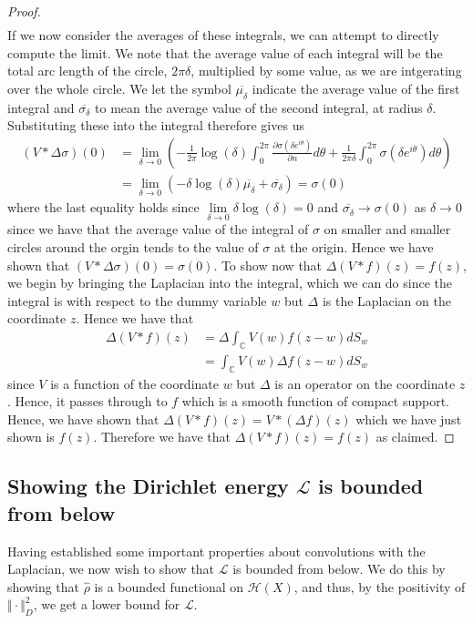 \documentclass[11pt]{report}
\theoremstyle{definition}
\begin{document}
\begin{proof}
\begin{align*}
  \end{align*}
  If we now consider the averages of these integrals, we can attempt to directly compute the limit. We note that the average value of each integral will be the total arc length of the circle, $2\pi \delta$, multiplied by some value, as we are intgerating over the whole circle. We let the symbol $\overline{\mu_{\delta}}$ indicate the average value of the first integral and $\overline{\sigma_{\delta}}$ to mean the average value of the second integral, at radius $\delta$. Substituting these into the integral therefore gives us
  \begin{align*}
    (V * \Delta \sigma)(0) &=\lim_{\delta \rightarrow 0} \left( -\frac{1}{2\pi}\log(\delta) \int_{0}^{2\pi} \frac{\partial \sigma(\delta e^{i\theta})}{\partial n} d\theta + \frac{1}{2\pi \delta}\int_{0}^{2\pi}\sigma(\delta e^{i\theta})d\theta\right) \\
    &= \lim_{\delta \rightarrow 0} \left( -\delta \log(\delta)  \overline{\mu_{\delta}}  + \overline{\sigma_{\delta}}\right) = \sigma(0)
  \end{align*}
  where the last equality holds since $\lim\limits_{\delta \rightarrow 0}\delta \log(\delta) = 0$ and $\overline{\sigma_{\delta}} \rightarrow \sigma(0)$ as $\delta \rightarrow 0$ since we have that the average value of the integral of $\sigma$ on smaller and smaller circles around the orgin tends to the value of $\sigma$ at the origin.
  Hence we have shown that $(V * \Delta \sigma)(0) = \sigma(0)$. \newline
  To show now that $\Delta(V*f)(z) = f(z)$, we begin by bringing the Laplacian into the integral, which we can do since the integral is with respect to the dummy variable $w$ but $\Delta$ is the Laplacian on the coordinate $z$. Hence we have that
  \begin{align*}
    \Delta(V*f)(z) &= \Delta \int_\mathbb{C} V(w)f(z-w)dS_w \\
    &= \int_\mathbb{C} V(w)\Delta f(z-w)dS_w
  \end{align*}
 since $V$ is a function of the coordinate $w$ but $\Delta$ is an operator on the coordinate $z$. Hence, it passes through to $f$ which is a smooth function of compact support. Hence, we have shown that $\Delta(V*f)(z) = V*(\Delta f)(z)$ which we have just shown is $f(z)$. Therefore we have that $\Delta(V*f)(z) = f(z)$ as claimed.
\end{proof} 

\subsection{Showing the Dirichlet energy $\mathcal{L}$ is bounded from below}
Having established some important properties about convolutions with the Laplacian, we now wish to show that $\mathcal{L}$ is bounded from below. We do this by showing that $\hat{\rho}$ is a bounded functional on $\mathcal{H}(X)$, and thus, by the positivity of $\Vert \cdot \Vert^2_D$, we get a lower bound for $\mathcal{L}$.
\end{document}
